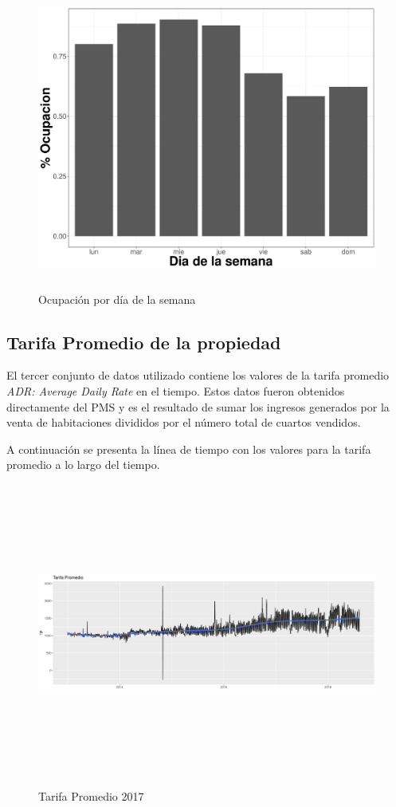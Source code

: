 \begin{figure}[H]
  \centering
      \includegraphics[width=\maxwidth,height=10cm]{Figures/Ocupacion_Dia_Semana-1}   
  \caption{Ocupación por día de la semana}
\end{figure}



\subsection*{Tarifa Promedio de la propiedad}

El tercer conjunto de datos utilizado contiene los valores de la tarifa promedio \emph{ADR: Average Daily Rate} en el tiempo. Estos datos fueron obtenidos directamente del PMS y es el resultado de sumar los ingresos generados por la venta de habitaciones divididos por el número total de cuartos vendidos. 

A continuación se presenta la línea de tiempo con los valores para la tarifa promedio a lo largo del tiempo.

\begin{figure}[H]
  \centering
      \includegraphics[width=\maxwidth,height=10cm]{figures/IndicadoresTarifaPromedio-1}    
  \caption{Tarifa Promedio 2017}
\end{figure}



